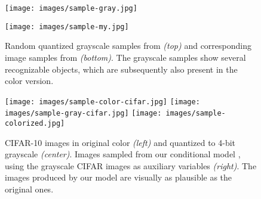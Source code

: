 \begin{figure*}
    \center
	\texttt{[image: images/sample-gray.jpg]}

  \vspace{1mm}

  \texttt{[image: images/sample-my.jpg]}
  \caption{Random quantized grayscale samples from  \textit{(top)} and
           corresponding image samples from  \textit{(bottom)}. The 
           grayscale samples show several recognizable objects, which are subsequently
           also present in the color version.}
    \label{fig:samples}
\end{figure*}

\begin{figure*}
    \center
	\texttt{[image: images/sample-color-cifar.jpg]}
    \quad
	\texttt{[image: images/sample-gray-cifar.jpg]}
    \quad
	\texttt{[image: images/sample-colorized.jpg]}
    \caption{CIFAR-10 images in original color \emph{(left)} and quantized to 4-bit grayscale \emph{(center)}.
     Images sampled from our conditional model , using the grayscale CIFAR images as auxiliary 
     variables \emph{(right)}. The images produced by our model are visually as plausible as the original ones.}
    \label{fig:coloring}
\end{figure*}



